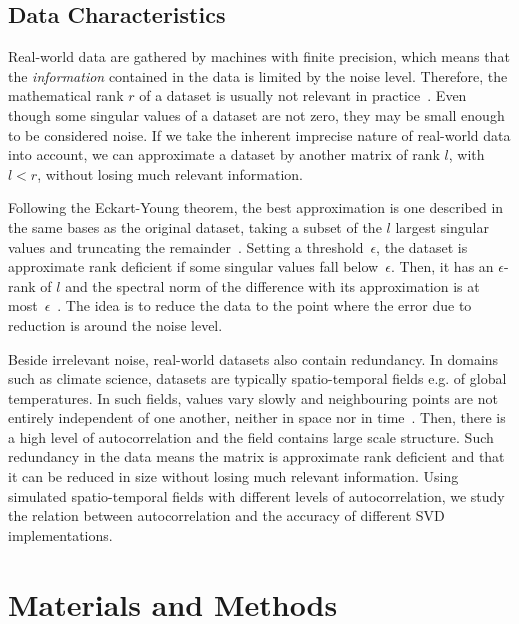\documentclass[ijgi,article,submit,moreauthors,pdftex,10pt,a4paper]{Definitions/mdpi}
\begin{document}
\subsection{Data Characteristics}
\label{sec:Introduction/Data Characteristics}

Real-world data are gathered by machines with finite precision, which means that the \textit{information} contained in the data is limited by the noise level. Therefore, the mathematical rank $r$ of a dataset is usually not relevant in practice~\cite{Martinsson2016}. Even though some singular values of a dataset are not zero, they may be small enough to be considered noise. If we take the inherent imprecise nature of real-world data into account, we can approximate a dataset by another matrix of rank $l$, with $l < r$, without losing much relevant information.

Following the Eckart-Young theorem, the best approximation is one described in the same bases as the original dataset, taking a subset of the $l$ largest singular values and truncating the remainder~\cite{Eckart1936}. Setting a threshold~$\epsilon$, the dataset is approximate rank deficient if some singular values fall below~$\epsilon$. Then, it has an $\epsilon$-rank of $l$ and the spectral norm of the difference with its approximation is at most~$\epsilon$~\cite{Martinsson2016}. The idea is to reduce the data to the point where the error due to reduction is around the noise level.

Beside irrelevant noise, real-world datasets also contain redundancy. In domains such as climate science, datasets are typically spatio-temporal fields e.g. of global temperatures. In such fields, values vary slowly and neighbouring points are not entirely independent of one another, neither in space nor in time~\cite{Eshel2011}. Then, there is a high level of autocorrelation and the field contains large scale structure. Such redundancy in the data means the matrix is approximate rank deficient and that it can be reduced in size without losing much relevant information. Using simulated spatio-temporal fields with different levels of autocorrelation, we study the relation between autocorrelation and the accuracy of different SVD implementations.

\section{Materials and Methods}
\label{sec:Materials and Methods}
\end{document}
